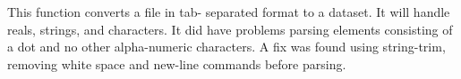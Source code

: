 \noindent This function converts a file in tab-
separated format to a dataset. It will handle reals,
strings, and characters. It did have problems parsing
elements consisting of a dot and no other
alpha-numeric characters. A fix was found using
string-trim, removing white space and new-line
commands before parsing.















